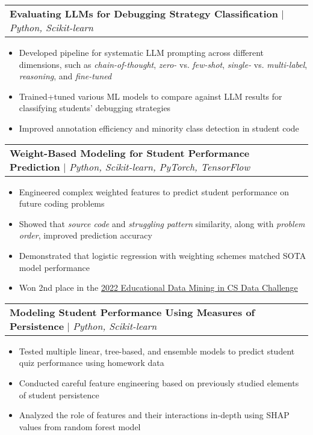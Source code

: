 \documentclass[letterpaper,11pt]{article}
\makeatletter
\newcommand{\resumeItem}[1]{
  \item\small{
    {#1 \vspace{-2pt}}
  }
}
\newcommand{\resumeProjectHeading}[2]{
    \item
    \begin{tabular*}{0.97\textwidth}{l@{\extracolsep{\fill}}r}
      \small#1 & #2 \\
    \end{tabular*}\vspace{-7pt}
}
\newcommand{\resumeItemListStart}{\begin{itemize}}
\newcommand{\resumeItemListEnd}{\end{itemize}\vspace{-5pt}}
\makeatother
\begin{document}
      \resumeProjectHeading
          {\textbf{Evaluating LLMs for Debugging Strategy Classification} $|$ \emph{Python, Scikit-learn}}{}
          \resumeItemListStart
            \resumeItem{Developed pipeline for systematic LLM prompting across different dimensions, such as \emph{chain-of-thought}, \emph{zero-} vs. \emph{few-shot}, \emph{single-} vs. \emph{multi-label}, \emph{reasoning}, and \emph{fine-tuned}}
            \resumeItem{Trained+tuned various ML models to compare against LLM results for classifying students' debugging strategies}
            \resumeItem{Improved annotation efficiency and minority class detection in student code}
          \resumeItemListEnd

      \resumeProjectHeading
          {\textbf{Weight-Based Modeling for Student Performance Prediction} $|$ \emph{Python, Scikit-learn, PyTorch, TensorFlow}}{}
          \resumeItemListStart
            \resumeItem{Engineered complex weighted features to predict student performance on future coding problems}
            \resumeItem{Showed that \emph{source code} and \emph{struggling pattern} similarity, along with \emph{problem order}, improved prediction accuracy} %
            \resumeItem{Demonstrated that logistic regression with weighting schemes matched SOTA model performance}
            \resumeItem{Won 2nd place in the \href{https://sites.google.com/ncsu.edu/csedm-dc-2021/home}{2022 Educational Data Mining in CS Data Challenge}}
          \resumeItemListEnd

      \resumeProjectHeading
          {\textbf{Modeling Student Performance Using Measures of Persistence} $|$ \emph{Python, Scikit-learn}}{}%
          \resumeItemListStart
            \resumeItem{Tested multiple linear, tree-based, and ensemble models to predict student quiz performance using homework data}
            \resumeItem{Conducted careful feature engineering based on previously studied elements of student persistence}
            \resumeItem{Analyzed the role of features and their interactions in-depth using SHAP values from random forest model}
          \resumeItemListEnd

\end{document}
